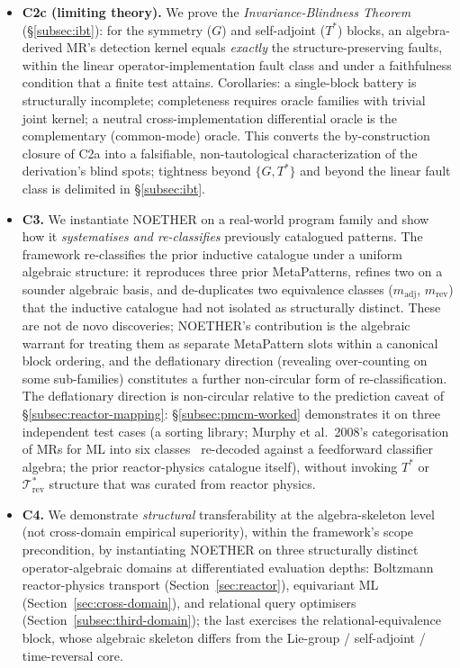 \documentclass[manuscript]{acmart}
\begin{document}
\begin{itemize}
  \item \textbf{C2c (limiting theory).} We prove the \emph{Invariance-Blindness Theorem} (\S\ref{subsec:ibt}): for the symmetry ($G$) and self-adjoint ($T^{*}$) blocks, an algebra-derived MR's detection kernel equals \emph{exactly} the structure-preserving faults, within the linear operator-implementation fault class and under a faithfulness condition that a finite test attains. Corollaries: a single-block battery is structurally incomplete; completeness requires oracle families with trivial joint kernel; a neutral cross-implementation differential oracle is the complementary (common-mode) oracle. This converts the by-construction closure of C2a into a falsifiable, non-tautological characterization of the derivation's blind spots; tightness beyond $\{G, T^{*}\}$ and beyond the linear fault class is delimited in \S\ref{subsec:ibt}.
  \item \textbf{C3.} We instantiate NOETHER on a real-world program family and show how it \emph{systematises and re-classifies} previously catalogued patterns. The framework re-classifies the prior inductive catalogue under a uniform algebraic structure: it reproduces three prior MetaPatterns, refines two on a sounder algebraic basis, and de-duplicates two equivalence classes ($m_{\mathrm{adj}}$, $m_{\mathrm{rev}}$) that the inductive catalogue had not isolated as structurally distinct. These are not de novo discoveries; NOETHER's contribution is the algebraic warrant for treating them as separate MetaPattern slots within a canonical block ordering, and the deflationary direction (revealing over-counting on some sub-families) constitutes a further non-circular form of re-classification. The deflationary direction is non-circular relative to the prediction caveat of \S\ref{subsec:reactor-mapping}: \S\ref{subsec:pmcm-worked} demonstrates it on three independent test cases (a sorting library; Murphy et al.\ 2008's categorisation of MRs for ML into six classes~\cite{Murphy2008} re-decoded against a feedforward classifier algebra; the prior reactor-physics catalogue itself), without invoking $T^{*}$ or $\mathcal{T}^{*}_{\mathrm{rev}}$ structure that was curated from reactor physics.
  \item \textbf{C4.} We demonstrate \emph{structural} transferability at the algebra-skeleton level (not cross-domain empirical superiority), within the framework's scope precondition, by instantiating NOETHER on three structurally distinct operator-algebraic domains at differentiated evaluation depths: Boltzmann reactor-physics transport (Section~\ref{sec:reactor}), equivariant ML (Section~\ref{sec:cross-domain}), and relational query optimisers (Section~\ref{subsec:third-domain}); the last exercises the relational-equivalence block, whose algebraic skeleton differs from the Lie-group / self-adjoint / time-reversal core.

\end{itemize}
\end{document}

